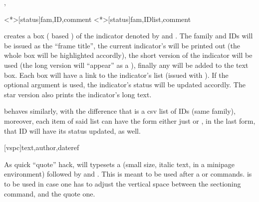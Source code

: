\documentclass[article,nofontwarning,nogeometry,english,tocdepth=3,secdepth=3]{ufrgscca} %
\begin{document}
\begin{codedescribe}{\indref,\indreflst}
	\begin{codesyntax}%
	\tsmacro{\indref}<*>[status]{fam,ID,comment}
	\tsmacro{\indreflst}<*>[status]{fam,IDlist,comment}
\end{codesyntax}
\tsmacro{\indref}{} creates a box ( based  ) of the indicator denoted by   and . The family and IDs will be issued as the “frame title”, the current indicator's  will be printed out (the whole box will be highlighted accordly), the short version of the indicator will be used (the long version will “appear” as a ), finally any  will be added to the text box. Each \tsmacro{\indref}{} box will have a link to the indicator's list (issued with \tsmacro{\PrintIndicators}{}). If the optional argument  is used, the indicator's status will be updated accordly. The star version also prints the indicator's long text.

\tsmacro{\indreflst}{} behaves similarly, with the difference that  is a csv list of IDs (same family), moreover, each item of said list can have the form either just  or , in the last form, that ID will have its status updated, as well.
\end{codedescribe}

\begin{codedescribe}{\fancyquote}
	\begin{codesyntax}%
	\tsmacro{\fancyquote}[vspc]{text,author,dateref}
\end{codesyntax}
As quick “quote” hack, \tsmacro{\fancyquote}{} will typesets a  (small size, italic  text, in a minipage environment) followed by  and . This is meant to be used after a \tsmacro{\chapter}{} or \tsmacro{\section}{} commands.  is to be used in case one has to adjust the vertical space between the sectioning command, and the quote one.
\end{codedescribe}
\end{document}
